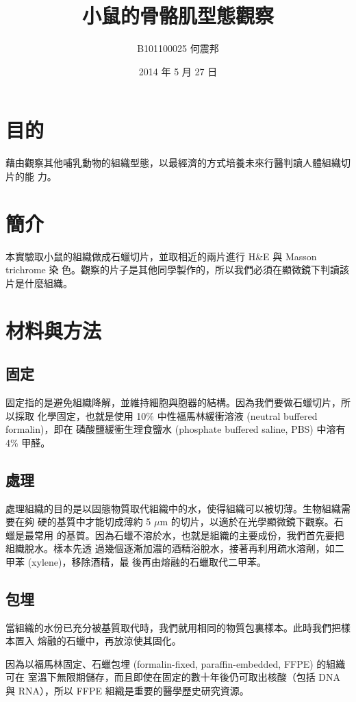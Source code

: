 \documentclass[a4paper,twocolumn]{article}
\begin{document}
\title{小鼠的骨骼肌型態觀察}
\author{B101100025 何震邦}
\date{2014 年 5 月 27 日}
\maketitle

\section{目的}
藉由觀察其他哺乳動物的組織型態，以最經濟的方式培養未來行醫判讀人體組織切片的能
力。

\section{簡介}
本實驗取小鼠的組織做成石蠟切片，並取相近的兩片進行 H\&E 與 Masson trichrome 染
色。觀察的片子是其他同學製作的，所以我們必須在顯微鏡下判讀該片是什麼組織。

\section{材料與方法}
\subsection{固定}
固定指的是避免組織降解，並維持細胞與胞器的結構。因為我們要做石蠟切片，所以採取
化學固定，也就是使用 10\% 中性福馬林緩衝溶液 (neutral buffered formalin)，即在
磷酸鹽緩衝生理食鹽水 (phosphate buffered saline, PBS) 中溶有 4\% 甲醛。

\subsection{處理}
處理組織的目的是以固態物質取代組織中的水，使得組織可以被切薄。生物組織需要在夠
硬的基質中才能切成薄約 5 $\mu$m 的切片，以適於在光學顯微鏡下觀察。石蠟是最常用
的基質。因為石蠟不溶於水，也就是組織的主要成份，我們首先要把組織脫水。樣本先透
過幾個逐漸加濃的酒精浴脫水，接著再利用疏水溶劑，如二甲苯 (xylene)，移除酒精，最
後再由熔融的石蠟取代二甲苯。

\subsection{包埋}
當組織的水份已充分被基質取代時，我們就用相同的物質包裏樣本。此時我們把樣本置入
熔融的石蠟中，再放涼使其固化。

因為以福馬林固定、石蠟包埋 (formalin-fixed, paraffin-embedded, FFPE) 的組織可在
室溫下無限期儲存，而且即使在固定的數十年後仍可取出核酸（包括 DNA 與 RNA），所以
FFPE 組織是重要的醫學歷史研究資源。
\end{document}

